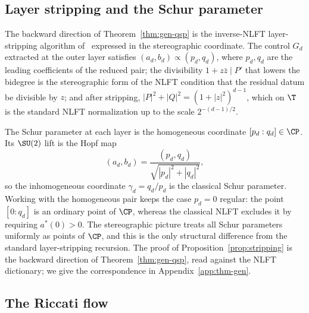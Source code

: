 \subsection{Layer stripping and the Schur parameter}
\label{subsec:stripping}

\begin{proposition}
	\label{prop:stripping}
	The backward direction of Theorem~\ref{thm:gen-qsp} is the
	inverse-NLFT layer-stripping algorithm
	of~\cite{NiSarkarYingLin2025,AlexisBeckerEtAl2026} expressed in
	the stereographic coordinate.  The control $G_d$ extracted at
	the outer layer satisfies $(a_d,b_d)\propto(p_d,q_d)$, where
	$p_d,q_d$ are the leading coefficients of the reduced pair; the
	divisibility $1+z\bar z\mid P'$ that lowers the bidegree is the
	stereographic form of the NLFT condition that the residual datum
	be divisible by $z$; and after stripping,
	$|P|^2+|Q|^2=(1+|z|^2)^{d-1}$, which on $\T$ is the standard
	NLFT normalization up to the scale $2^{-(d-1)/2}$.
\end{proposition}

The Schur parameter at each layer is the homogeneous coordinate
$[p_d:q_d]\in\CP$.  Its $\SU(2)$ lift is the Hopf map
\begin{equation}
	(a_d,b_d)=\frac{(p_d,q_d)}{\sqrt{|p_d|^2+|q_d|^2}},
	\label{eq:hopf}
\end{equation}
so the inhomogeneous coordinate $\gamma_d=q_d/p_d$ is the classical
Schur parameter.  Working with the homogeneous pair keeps the case
$p_d=0$ regular: the point $[0:q_d]$ is an ordinary point of $\CP$,
whereas the classical NLFT excludes it by requiring $a^*(0)>0$.
The stereographic picture treats all Schur parameters uniformly as
points of $\CP$, and this is the only structural difference from
the standard layer-stripping recursion.  The proof of
Proposition~\ref{prop:stripping} is the backward direction of
Theorem~\ref{thm:gen-qsp}, read against the NLFT dictionary; we
give the correspondence in Appendix~\ref{app:thm-gen}.

\subsection{The Riccati flow}
\label{subsec:riccati}

